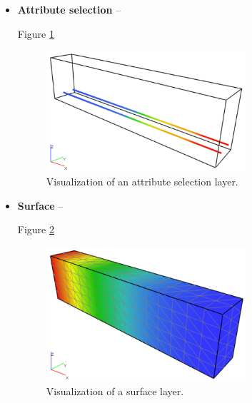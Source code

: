 \begin{itemize}
    \item \textbf{Attribute selection} -- 
    
    Figure \ref{fig:beam-attribute-selection-layer}
    
    \begin{figure}[H]
        \centering
        \includegraphics[width=0.7\textwidth]{figures/chapter-data-management/beam-attribute-selection-layer}
        \decoRule
        \caption{Visualization of an attribute selection layer.}
        \label{fig:beam-attribute-selection-layer}
    \end{figure}

    \item \textbf{Surface} -- 

    Figure \ref{fig:beam-surface-layer}

    \begin{figure}[H]
        \centering
        \includegraphics[width=0.7\textwidth]{figures/chapter-data-management/beam-surface-layer}
        \decoRule
        \caption{Visualization of a surface layer.}
        \label{fig:beam-surface-layer}
    \end{figure}

\end{itemize}


